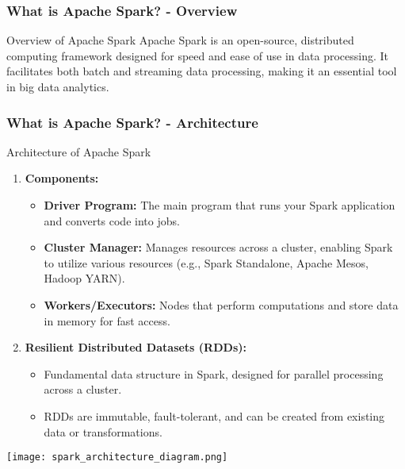 \documentclass[aspectratio=169]{beamer}
\begin{document}
\begin{frame}[fragile]
    \frametitle{What is Apache Spark? - Overview}
    \begin{block}{Overview of Apache Spark}
        Apache Spark is an open-source, distributed computing framework designed for speed and ease of use in data processing.
        It facilitates both batch and streaming data processing, making it an essential tool in big data analytics.
    \end{block}
\end{frame}

\begin{frame}[fragile]
    \frametitle{What is Apache Spark? - Architecture}
    \begin{block}{Architecture of Apache Spark}
        \begin{enumerate}
            \item \textbf{Components:}
                \begin{itemize}
                    \item \textbf{Driver Program:} The main program that runs your Spark application and converts code into jobs.
                    \item \textbf{Cluster Manager:} Manages resources across a cluster, enabling Spark to utilize various resources (e.g., Spark Standalone, Apache Mesos, Hadoop YARN).
                    \item \textbf{Workers/Executors:} Nodes that perform computations and store data in memory for fast access.
                \end{itemize}

            \item \textbf{Resilient Distributed Datasets (RDDs):}
                \begin{itemize}
                    \item Fundamental data structure in Spark, designed for parallel processing across a cluster.
                    \item RDDs are immutable, fault-tolerant, and can be created from existing data or transformations.
                \end{itemize}
        \end{enumerate}
    \end{block}
    \vspace{0.5cm}
    \begin{center}
        \texttt{[image: spark\_architecture\_diagram.png]}  %
    \end{center}
\end{frame}
\end{document}
